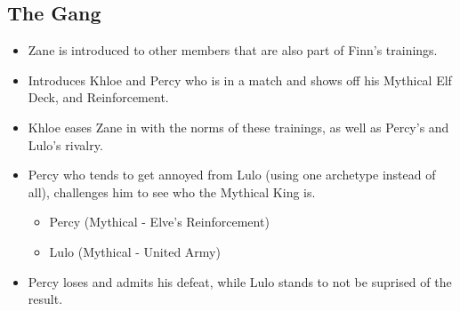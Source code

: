 \subsection{The Gang}
\begin{itemize}
    \item Zane is introduced to other members that are also part of Finn's trainings. 
    \item Introduces Khloe and Percy who is in a match and shows off his Mythical Elf Deck, and 
    Reinforcement. 
    \item Khloe eases Zane in with the norms of these trainings, as well as Percy's and Lulo's rivalry. 
    \item Percy who tends to get annoyed from Lulo (using one archetype instead of all), challenges him to see who 
    the Mythical King is. 
        \begin{itemize}
            \item Percy (Mythical - Elve's Reinforcement)
            \item Lulo (Mythical - United Army)
        \end{itemize}
    \item Percy loses and admits his defeat, while Lulo stands to not be suprised of the result. 
\end{itemize}